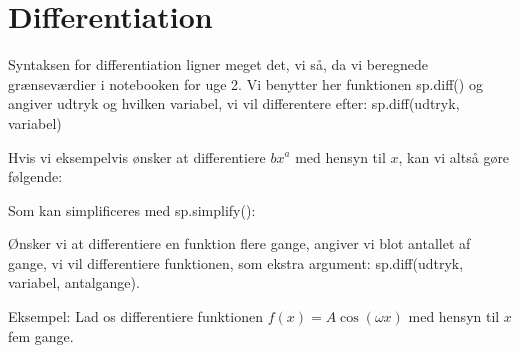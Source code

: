 \documentclass[letterpaper,10pt,english]{jupyterBook}
\begin{document}
\noindent{}


\section{Differentiation}
\label{\detokenize{notebooks/sympy/Notebook4:differentiation}}
Syntaksen for differentiation ligner meget det, vi så, da vi beregnede grænseværdier i notebooken for uge 2. Vi benytter her funktionen sp.diff() og angiver udtryk og hvilken variabel, vi vil differentere efter: sp.diff(udtryk, variabel)

Hvis vi eksempelvis ønsker at differentiere \(\displaystyle b x^{a}\) med hensyn til \(x\), kan vi altså gøre følgende:

\begin{sphinxVerbatim}[commandchars=\\\{\}]
                      

        
\end{sphinxVerbatim}

\noindent{}

\noindent{}

Som kan simplificeres med sp.simplify():

\begin{sphinxVerbatim}[commandchars=\\\{\}]
\end{sphinxVerbatim}

\noindent{}

Ønsker vi at differentiere en funktion flere gange, angiver vi blot antallet af gange, vi vil differentiere funktionen, som ekstra argument: sp.diff(udtryk, variabel, antalgange).

Eksempel: Lad os differentiere funktionen \(f(x) = A \cos(\omega x)\) med hensyn til \(x\) fem gange.

\begin{sphinxVerbatim}[commandchars=\\\{\}]
            
         
\end{sphinxVerbatim}
\end{document}
